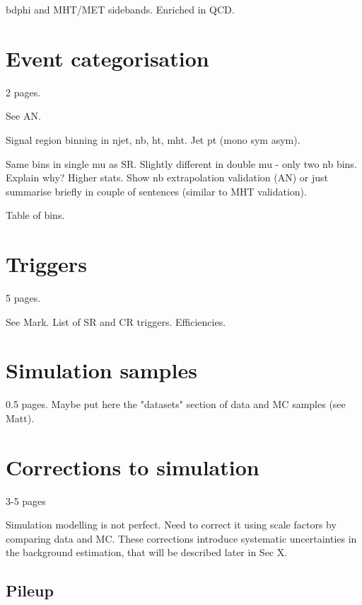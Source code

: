 bdphi and MHT/MET sidebands. Enriched in QCD.

\section{Event categorisation}
2 pages.

See AN.

Signal region binning in njet, nb, ht, mht. 
Jet pt (mono sym asym).

Same bins in single mu as SR.
Slightly different in double mu - only two nb bins. Explain why? Higher stats. 
Show nb extrapolation validation (AN) or just summarise briefly in couple of 
sentences (similar to MHT validation).

Table of bins.



\section{Triggers}
5 pages.

See Mark.
List of SR and CR triggers.
Efficiencies.

\section{Simulation samples}
0.5 pages.
Maybe put here the "datasets" section of data and MC samples (see Matt).

\section{Corrections to simulation}
3-5 pages

Simulation modelling is not perfect. Need to correct it using scale factors by 
comparing data and MC. These corrections introduce systematic uncertainties in 
the background estimation, that will be described later in Sec X.

\subsection{Pileup}
